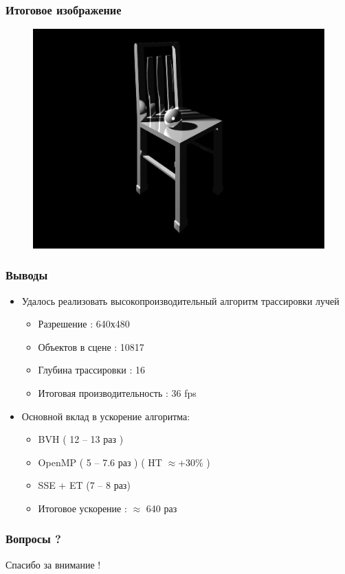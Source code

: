 \documentclass[utf8, 12pt]{beamer}
\begin{document}
\begin{frame}
\frametitle{Итоговое изображение}
\begin{figure}[H]
\centering
\includegraphics[scale=0.16]{imgs/stulb.png}
\end{figure}

\end{frame}

\begin{frame}
\frametitle{Выводы}
\begin{itemize}
\item Удалось реализовать высокопроизводительный алгоритм трассировки лучей
\begin{itemize}
\item Разрешение : 640х480
\item Объектов в сцене : 10817
\item Глубина трассировки : 16 
\item Итоговая производительность : 36 fps
\end{itemize}
\item Основной вклад в ускорение алгоритма:
\begin{itemize}
\item BVH ( 12 -- 13 раз )
\item OpenMP ( 5 -- 7.6 раз ) ( HT $\approx$+30\% )
\item SSE + ET (7 -- 8 раз)
\item Итоговое ускорение : $\approx$ 640 раз
\end{itemize}
\end{itemize}
\end{frame}

\begin{frame}
\frametitle{Вопросы ?}
\begin{center}
{\huge Спасибо за внимание !}
\end{center}
\end{frame}
\end{document}
